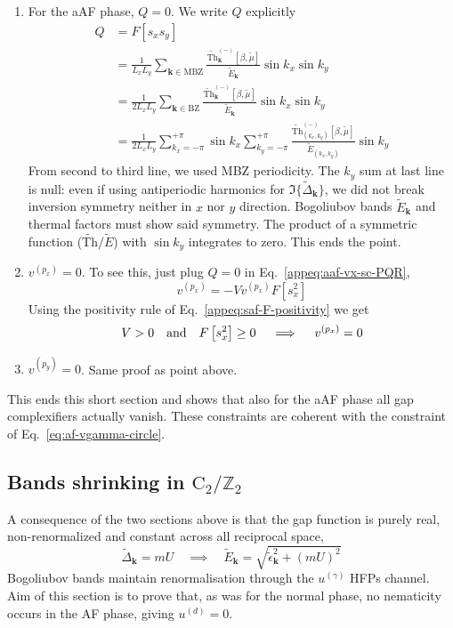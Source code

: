 \begin{enumerate}
	\item For the aAF phase, $Q=0$. We write $Q$ explicitly
	\[
	\begin{aligned}
		Q &= F\left[s_x s_y\right] \\
		&= \frac{1}{L_x L_y} \sum_{\mathbf{k}\in\mathrm{MBZ}} \frac{\tilde{\mathrm{Th}}_\mathbf{k}^{(-)}[\beta,\tilde{\mu}]}{\tilde{E}_\mathbf{k}} \sin k_x \sin k_y \\
		&= \frac{1}{2L_x L_y} \sum_{\mathbf{k}\in\mathrm{BZ}} \frac{\tilde{\mathrm{Th}}_\mathbf{k}^{(-)}[\beta,\tilde{\mu}]}{\tilde{E}_\mathbf{k}} \sin k_x \sin k_y \\
		&= \frac{1}{2L_x L_y} \sum_{k_x=-\pi}^{+\pi} \sin k_x \sum_{k_y=-\pi}^{+\pi} \frac{\tilde{\mathrm{Th}}_{(k_x,k_y)}^{(-)}[\beta,\tilde{\mu}]}{\tilde{E}_{(k_x,k_y)}} \sin k_y
	\end{aligned}
	\]
	From second to third line, we used MBZ periodicity. The $k_y$ sum at last line is null: even if using antiperiodic harmonics for $\Im\lbrace \tilde{\Delta}_\mathbf{k} \rbrace$, we did not break inversion symmetry neither in $x$ nor $y$ direction. Bogoliubov bands $\tilde{E}_\mathbf{k}$ and thermal factors must show said symmetry. The product of a symmetric function ($\tilde{\mathrm{Th}}/\tilde{E}$) with $\sin k_y$ integrates to zero. This ends the point.
	\item $v^{(p_x)}=0$. To see this, just plug $Q=0$ in Eq.~\eqref{appeq:aaf-vx-sc-PQR},
	\[
	v^{(p_x)} = - V v^{(p_x)} F\left[ s_x^2 \right]
	\]
	Using the positivity rule of Eq.~\eqref{appeq:saf-F-positivity} we get
	\[
	V > 0 \qq{and} F\left[ s_x^2 \right] \ge 0
	\quad\implies\quad
	v^{(p_x)} = 0
	\]
	\item $v^{(p_y)}=0$. Same proof as point above.
\end{enumerate}
This ends this short section and shows that also for the aAF phase all gap complexifiers actually vanish. These constraints are coherent with the constraint of Eq.~\eqref{eq:af-vgamma-circle}.

\subsection{Bands shrinking in $\mathrm{C}_2/\mathbb{Z}_2$}\label{appsubsec:af-bands-shrinking-C2}

A consequence of the two sections above is that the gap function is purely real, non-renormalized and constant across all reciprocal space,
\[
	\tilde{\Delta}_\mathbf{k} = mU
	\quad\implies\quad
	\tilde{E}_\mathbf{k} = \sqrt{\tilde{\epsilon}_\mathbf{k}^2 + (mU)^2}
\]
Bogoliubov bands maintain renormalisation through the $u^{(\gamma)}$ HFPs channel. Aim of this section is to prove that, as was for the normal phase, no nematicity occurs in the AF phase, giving $u^{(d)}=0$. 


